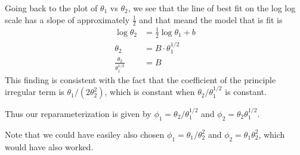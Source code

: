 \documentclass[answers,12pt,addpoints]{exam}
\begin{document}
\begin{questions}
\begin{solution}
Going back to the plot of $\theta_1$ vs $\theta_2$, we see that the line of best fit on the log log scale has a slope of approximately $\frac{1}{2}$ and that meand the model that is fit is 
\begin{align*}
    \log \theta_2 &= \frac{1}{2} \log \theta_1 + b \\
    \theta_2 &= B \cdot \theta_1^{1/2} \\
    \frac{\theta_2}{\theta_1^{1/2}} &= B
\end{align*}
This finding is consistent with the fact that the coefficient of the principle irregular term is $\theta_1 / (2 \theta_2^2)$, which is constant when $\theta_2 / \theta_1^{1/2}$ is constant.

Thus our reparameterization is given by $\phi_1 = \theta_2 / \theta_1^{1/2}$ and $\phi_2 = \theta_2 \theta_1^{1/2}$.

Note that we could have easiley also chosen $\phi_1 = \theta_1 / \theta_2^2$ and $\phi_2 = \theta_1 \theta_2^2$, which would have also worked.
\end{solution}

\end{questions}
\end{document}
